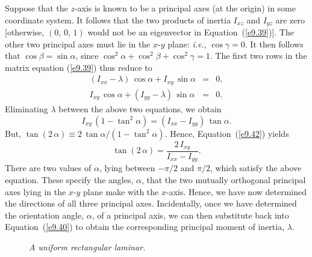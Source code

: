 Suppose that the $z$-axis is known to be a principal axes (at the origin)
in some coordinate system. It follows that the two products of inertia $I_{xz}$
and $I_{yz}$ are zero [otherwise, $(0,\,0,\,1)$ would not be an eigenvector in Equation~(\ref{e9.39})]. The other two principal axes must lie in the
$x$-$y$ plane: {\em i.e.}, $\cos\gamma=0$. It then follows that $\cos\beta=\sin\alpha$, since $\cos^2\alpha+\cos^2\beta+ \cos^2\gamma=1$. 
The first two rows in the matrix equation (\ref{e9.39}) thus
reduce to
\begin{eqnarray}\label{e9.40}
(I_{xx}-\lambda)\,\cos\alpha + I_{xy}\,\sin\alpha &=& 0,\\[0.5ex]
I_{xy}\,\cos\alpha + (I_{yy}-\lambda)\,\sin\alpha &=& 0.
\end{eqnarray}
Eliminating $\lambda$ between the above two equations, we obtain 
\begin{equation}\label{e9.42}
I_{xy} \,(1-\tan^2\alpha) = (I_{xx}-I_{yy})\,\tan\alpha.
\end{equation}
But, $\tan( 2\,\alpha) \equiv 2\,\tan\alpha/(1-\tan^2\alpha)$. Hence, Equation~(\ref{e9.42}) yields
\begin{equation}\label{e9.43}
\tan (2\,\alpha) = \frac{2\,I_{xy}}{I_{xx} - I_{yy}}.
\end{equation}
There are two values of $\alpha$, lying between $-\pi/2$ and $\pi/2$, which
satisfy the above equation. These specify the angles, $\alpha$, that
 the two mutually orthogonal principal axes lying in the $x$-$y$ plane
make with the $x$-axis. Hence, we have now determined the directions of
all three principal axes. Incidentally, once we have determined the orientation angle, $\alpha$, of a principal axis, 
we can then substitute back into Equation~(\ref{e9.40}) to obtain the corresponding
principal moment of inertia, $\lambda$. 

\begin{figure}
\epsfysize=2.5in
\centerline{}
\caption{\em A uniform rectangular laminar.}\label{lam}
\end{figure}

